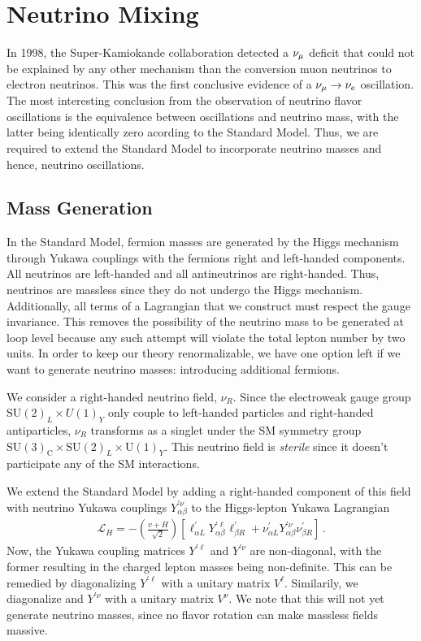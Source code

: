 % 
% 

\section{Neutrino Mixing}\label{ch:oscillation}
In 1998, the Super-Kamiokande collaboration detected a $\nu_\mu$ deficit that could not be explained by any other mechanism
than the conversion muon neutrinos to electron neutrinos. This was the first conclusive evidence of a $\nu_\mu \to \nu_e$ oscillation.
The most interesting conclusion from the observation of neutrino flavor oscillations is the equivalence between oscillations and neutrino mass, 
with the latter being identically zero acording to the Standard Model. Thus, we are required to extend the Standard Model to incorporate neutrino 
masses and hence, neutrino oscillations.

\subsection{Mass Generation}
In the Standard Model, fermion masses are generated by the Higgs mechanism through Yukawa couplings with the fermions right and left-handed components.
All neutrinos are left-handed and all antineutrinos are right-handed. Thus, neutrinos are massless since they do not undergo the Higgs mechanism.
Additionally, all terms of a Lagrangian that we construct must respect the gauge invariance. This removes the possibility of the neutrino mass to be 
generated at loop level because any such attempt will violate the total lepton number by two units.
In order to keep our theory renormalizable, we have one option left if we want to generate neutrino masses: introducing additional fermions. 

We consider a right-handed neutrino field, $\nu_R$. Since the electroweak gauge group $\text{SU}(2)_L \times U(1)_Y$ only couple to 
left-handed particles and right-handed antiparticles, $\nu_R$ transforms as a singlet under the SM symmetry 
group $\mathrm{SU}(3)_{\mathrm{C}} \times \mathrm{SU}(2)_{L} \times \mathrm{U}(1)_{Y}$. 
This neutrino field is \emph{sterile} since it doesn't participate any of the SM interactions. 

We extend the Standard Model by adding a right-handed component of this field with neutrino Yukawa couplings $Y_{\alpha \beta}^{\prime \nu}$ to the Higgs-lepton Yukawa Lagrangian 
\begin{align}
    \mathcal{L}_{H}=-\left( \frac{v + H}{\sqrt{2}} \right) \left[\ell_{\alpha L}^{\prime} Y_{\alpha \beta}^{\prime \ell} \ell_{\beta R}^{\prime} + \nu_{\alpha L}^{\prime} Y_{\alpha \beta}^{\prime \nu} \nu_{\beta R}^{\prime}\right]\,.
\end{align}
Now, the Yukawa coupling matrices $Y^{\prime \ell}$ and $Y^{\prime \nu}$ are non-diagonal, with the former resulting in the charged lepton masses being non-definite. This can be remedied by diagonalizing $Y^{\prime \ell}$ with a unitary matrix $V^\ell$.
Similarily, we diagonalize and $Y^{\prime \nu}$ with a unitary matrix $V^\nu$. We note that this will not yet generate neutrino masses, since no flavor rotation can make massless fields massive.


